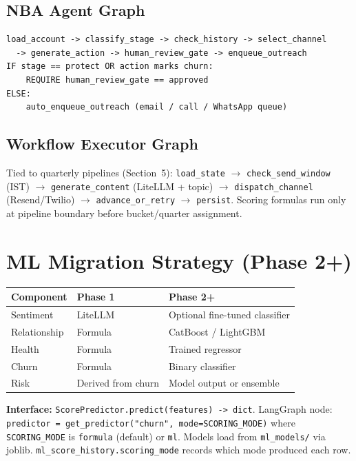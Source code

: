 \documentclass[11pt,a4paper]{article}
\begin{document}
\subsection{NBA Agent Graph}

\begin{lstlisting}
load_account -> classify_stage -> check_history -> select_channel
  -> generate_action -> human_review_gate -> enqueue_outreach
IF stage == protect OR action marks churn:
    REQUIRE human_review_gate == approved
ELSE:
    auto_enqueue_outreach (email / call / WhatsApp queue)
\end{lstlisting}

\subsection{Workflow Executor Graph}

Tied to quarterly pipelines (Section~5): \texttt{load\_state} $\rightarrow$ \texttt{check\_send\_window} (IST) $\rightarrow$ \texttt{generate\_content} (LiteLLM + topic) $\rightarrow$ \texttt{dispatch\_channel} (Resend/Twilio) $\rightarrow$ \texttt{advance\_or\_retry} $\rightarrow$ \texttt{persist}. Scoring formulas run only at pipeline boundary before bucket/quarter assignment.

\section{ML Migration Strategy (Phase 2+)}

\begin{longtable}{@{}p{3cm}p{4.5cm}p{4.5cm}@{}}
\toprule
\textbf{Component} & \textbf{Phase 1} & \textbf{Phase 2+} \\
\midrule
\endhead
Sentiment & LiteLLM & Optional fine-tuned classifier \\
Relationship & Formula & CatBoost / LightGBM \\
Health & Formula & Trained regressor \\
Churn & Formula & Binary classifier \\
Risk & Derived from churn & Model output or ensemble \\
\bottomrule
\end{longtable}

\textbf{Interface:} \texttt{ScorePredictor.predict(features) -> dict}. LangGraph node: \texttt{predictor = get\_predictor("churn", mode=SCORING\_MODE)} where \texttt{SCORING\_MODE} is \texttt{formula} (default) or \texttt{ml}. Models load from \texttt{ml\_models/} via joblib. \texttt{ml\_score\_history.scoring\_mode} records which mode produced each row.
\end{document}
